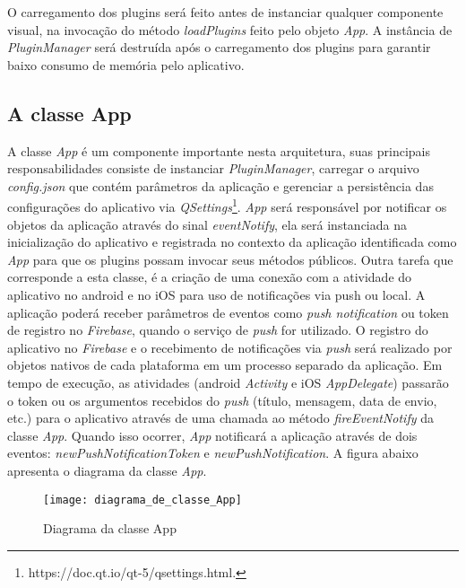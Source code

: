 O carregamento dos plugins será feito antes de instanciar qualquer componente visual, na invocação do método \textit{loadPlugins} feito pelo objeto \textit{App}. A instância de \textit{PluginManager} será destruída após o carregamento dos plugins para garantir baixo consumo de memória pelo aplicativo.


\subsection{A classe App}\label{sec:solucao-desenvolvida}
A classe \textit{App} é um componente importante nesta arquitetura, suas principais responsabilidades consiste de instanciar \textit{PluginManager}, carregar o arquivo \textit{config.json} que contém parâmetros da aplicação e gerenciar a persistência das configurações do aplicativo via \textit{QSettings}\footnote{https://doc.qt.io/qt-5/qsettings.html.}. \textit{App} será responsável por notificar os objetos da aplicação através do sinal \textit{eventNotify}, ela será instanciada na inicialização do aplicativo e registrada no contexto da aplicação identificada como \textit{App} para que os plugins possam invocar seus métodos públicos. Outra tarefa que corresponde a esta classe, é a criação de uma conexão com a atividade do aplicativo no android e no iOS para uso de notificações via push ou local. A aplicação poderá receber parâmetros de eventos como \textit{push notification} ou token de registro no \textit{Firebase}, quando o serviço de \textit{push} for utilizado. O registro do aplicativo no \textit{Firebase} e o recebimento de notificações via \textit{push} será realizado por objetos nativos de cada plataforma em um processo separado da aplicação. Em tempo de execução, as atividades (android \textit{Activity} e iOS \textit{AppDelegate}) passarão o token ou os argumentos recebidos do \textit{push} (título, mensagem, data de envio, etc.) para o aplicativo através de uma chamada ao método \textit{fireEventNotify} da classe \textit{App}. Quando isso ocorrer, \textit{App} notificará a aplicação através de dois eventos: \textit{newPushNotificationToken} e \textit{newPushNotification}. A figura abaixo apresenta o diagrama da classe \textit{App}.

\begin{figure}[H]
	\texttt{[image: diagrama\_de\_classe\_App]}
	\centering
	\caption{Diagrama da classe App}
\end{figure}

